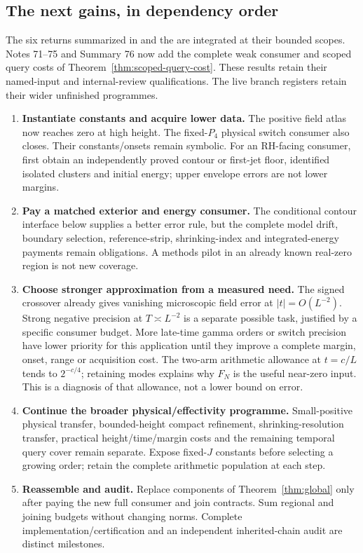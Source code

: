 \subsection{The next gains, in dependency order}
The six returns summarized in 
and the 
are integrated at their bounded scopes. Notes 71--75 and Summary 76
now add the complete weak consumer and scoped query costs of
Theorem~\ref{thm:scoped-query-cost}. These results retain their named-input
and internal-review qualifications. The live branch registers retain
their wider unfinished programmes.
\begin{enumerate}[leftmargin=*]
\item \textbf{Instantiate constants and acquire lower data.}
The positive field atlas now reaches zero at high height. The fixed-$P_4$
physical switch consumer also closes. Their constants/onsets remain
symbolic. For an RH-facing consumer, first obtain an independently
proved contour or first-jet floor, identified isolated clusters and
initial energy; upper envelope errors are not lower margins.
\item \textbf{Pay a matched exterior and energy consumer.}
The conditional contour interface below supplies a better error rule,
but the complete model drift, boundary selection, reference-strip,
shrinking-index and integrated-energy payments remain obligations.
A methods pilot in an already known real-zero region is not new coverage.
\item \textbf{Choose stronger approximation from a measured need.}
The signed crossover already gives vanishing microscopic field error
at $|t|=O(L^{-2})$. Strong negative precision at $T\asymp L^{-2}$
is a separate possible task, justified by a specific consumer budget.
More late-time gamma orders or switch precision have lower priority for
this application until they improve a complete margin, onset, range or
acquisition cost. The two-arm arithmetic allowance at $t=c/L$ tends to
$2^{-c/4}$; retaining modes explains why $F_N$ is the useful near-zero
input. This is a diagnosis of that allowance, not a lower bound on error.
\item \textbf{Continue the broader physical/effectivity programme.}
Small-positive physical transfer, bounded-height compact refinement,
shrinking-resolution transfer, practical height/time/margin costs and
the remaining temporal query cover remain separate. Expose fixed-$J$ constants before selecting
a growing order; retain the complete arithmetic population at each step.
\item \textbf{Reassemble and audit.}
Replace components of Theorem~\ref{thm:global} only after paying the
new full consumer and join contracts. Sum regional and joining budgets
without changing norms. Complete implementation/certification and an
independent inherited-chain audit are distinct milestones.
\end{enumerate}
